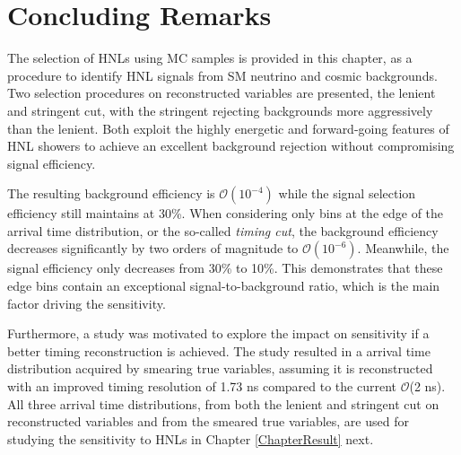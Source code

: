 \section{Concluding Remarks}
\label{sec:select_conclude}

The selection of HNLs using MC samples is provided in this chapter, as a procedure to identify HNL signals from SM neutrino and cosmic backgrounds.
Two selection procedures on reconstructed variables are presented, the lenient and stringent cut, with the stringent rejecting backgrounds more aggressively than the lenient.
Both exploit the highly energetic and forward-going features of HNL showers to achieve an excellent background rejection without compromising signal efficiency.

The resulting background efficiency is $\mathcal{O}(10^{-4})$ while the signal selection efficiency still maintains at 30\%. 
When considering only bins at the edge of the arrival time distribution, or the so-called \textit{timing cut}, the background efficiency decreases significantly by two orders of magnitude to $\mathcal{O}(10^{-6})$.
Meanwhile, the signal efficiency only decreases from 30\% to 10\%. 
This demonstrates that these edge bins contain an exceptional signal-to-background ratio, which is the main factor driving the sensitivity.

Furthermore, a study was motivated to explore the impact on sensitivity if a better timing reconstruction is achieved.
The study resulted in a arrival time distribution acquired by smearing true variables, assuming it is reconstructed with an improved timing resolution of 1.73 ns compared to the current $\mathcal{O}$(2 ns).
All three arrival time distributions, from both the lenient and stringent cut on reconstructed variables and from the smeared true variables, are used for studying the sensitivity to HNLs in Chapter \ref{ChapterResult} next. 


